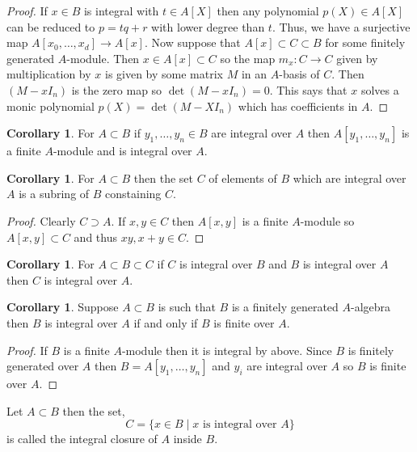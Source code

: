 \documentclass[12pt]{article}
\theoremstyle{remark}
\theoremstyle{definition}
\newtheorem{corollary}[theorem]{Corollary}
\newenvironment{definition}[1][Definition:]{\begin{trivlist}
\item[\hskip \labelsep {\bfseries #1}]}{\end{trivlist}}
\begin{document}
\begin{proof}
If $x \in B$ is integral with $t \in A[X]$ then any polynomial $p(X) \in A[X]$ can be reduced to $p = tq + r$ with lower degree than $t$. Thus, we have a surjective map $A[x_0, \dots, x_d] \to A[x]$. Now suppose that $A[x] \subset C \subset B$ for some finitely generated $A$-module. Then $x \in A[x] \subset C$ so the map $m_x : C \to C$ given by multiplication by $x$ is given by some matrix $M$ in an $A$-basis of $C$. Then $(M - x I_n)$ is the zero map so $\det{(M - x I_n)} = 0$. This says that $x$ solves a monic polynomial $p(X) = \det{(M - X I_n)}$ which has coefficients in $A$. 
\end{proof}

\begin{corollary}
For $A \subset B$ if $y_1, \dots, y_n \in B$ are integral over $A$ then $A[y_1, \dots, y_n]$ is a finite $A$-module and is integral over $A$. 
\end{corollary}

\begin{corollary}
For $A \subset B$ then the set $C$ of elements of $B$ which are integral over $A$ is a subring of $B$ constaining $C$.
\end{corollary}

\begin{proof}
Clearly $C \supset A$. If $x, y \in C$ then $A[x,y]$ is a finite $A$-module so $A[x,y] \subset C$ and thus $xy, x + y \in C$. 
\end{proof}

\begin{corollary}
For $A \subset B \subset C$ if $C$ is integral over $B$ and $B$ is integral over $A$ then $C$ is integral over $A$. 
\end{corollary}

\begin{corollary}
Suppose $A \subset B$ is such that $B$ is a finitely generated $A$-algebra then $B$ is integral over $A$ if and only if $B$ is finite over $A$. 
\end{corollary}

\begin{proof}
If $B$ is a finite $A$-module then it is integral by above. Since $B$ is finitely generated over $A$ then $B = A[y_1, \dots, y_n]$ and $y_i$ are integral over $A$ so $B$ is finite over $A$. 
\end{proof}

\begin{definition}
Let $A \subset B$ then the set,
\[ C = \{ x \in B \mid x \text{ is integral over } A\} \]
is called the integral closure of $A$ inside $B$.
\end{definition}
\end{document}
